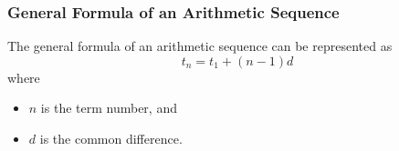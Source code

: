 \subsubsection{General Formula of an Arithmetic Sequence}

The general formula of an arithmetic sequence can be represented as \[ t_n = t_1 + (n-1)d \] where 
\begin{itemize}
  \item $n$ is the term number, and
  \item $d$ is the common difference.
\end{itemize}